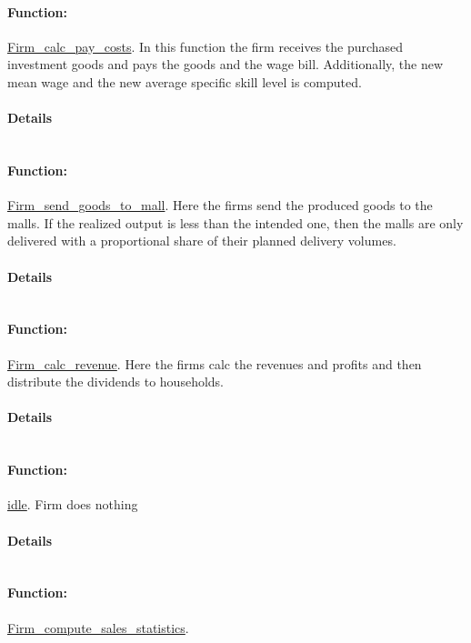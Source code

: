 \documentclass[a4paper,11pt]{article}
\begin{document}
\paragraph{Function:}\url{Firm_calc_pay_costs}.
In this function the firm receives the purchased investment
 goods and pays the goods and   the wage bill. Additionally, the 
 new mean wage and the new average specific skill level is computed.
\paragraph{Details}
\begin{verbatim}
\end{verbatim}
\paragraph{Function:}\url{Firm_send_goods_to_mall}.
Here the firms send the produced goods to the malls. 
If the realized output is less than the intended one, then 
the malls are only delivered with a proportional 
share of their planned delivery volumes.
\paragraph{Details}
\begin{verbatim}
\end{verbatim}
\paragraph{Function:}\url{Firm_calc_revenue}.
Here the firms calc the revenues and profits and then 
distribute the dividends to households.
\paragraph{Details}
\begin{verbatim}
\end{verbatim}
\paragraph{Function:}\url{idle}.
Firm does nothing
\paragraph{Details}
\begin{verbatim}
\end{verbatim}
\paragraph{Function:}\url{Firm_compute_sales_statistics}.
\end{document}
